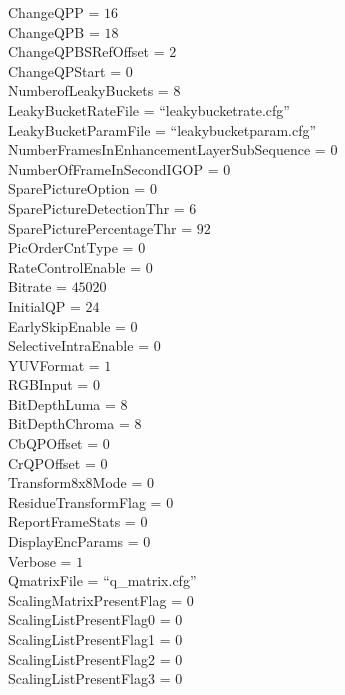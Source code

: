 ChangeQPP                = $16$ \\
ChangeQPB                = $18$ \\
ChangeQPBSRefOffset      =  $2$ \\
ChangeQPStart            =  $0$ \\
NumberofLeakyBuckets     =  $8$ \\
LeakyBucketRateFile      =  ``leakybucketrate.cfg'' \\
LeakyBucketParamFile     =  ``leakybucketparam.cfg'' \\
NumberFramesInEnhancementLayerSubSequence  = $0$ \\
NumberOfFrameInSecondIGOP                  = $0$ \\
SparePictureOption        =  $0$ \\
SparePictureDetectionThr  =  $6$ \\
SparePicturePercentageThr = $92$ \\
PicOrderCntType           = $0$ \\
RateControlEnable    =      $0$ \\
Bitrate              =  $45020$ \\
InitialQP            =     $24$ \\
EarlySkipEnable      =      $0$ \\
SelectiveIntraEnable =      $0$ \\
YUVFormat             = $1$ \\
RGBInput              = $0$ \\
BitDepthLuma          = $8$ \\
BitDepthChroma        = $8$ \\
CbQPOffset            = $0$ \\
CrQPOffset            = $0$ \\
Transform8x8Mode      = $0$ \\
ResidueTransformFlag  = $0$ \\
ReportFrameStats      = $0$ \\
DisplayEncParams      = $0$ \\
Verbose               = $1$ \\
QmatrixFile              = ``q\_matrix.cfg'' \\
ScalingMatrixPresentFlag = $0$ \\
ScalingListPresentFlag0  = $0$ \\
ScalingListPresentFlag1  = $0$ \\
ScalingListPresentFlag2  = $0$ \\
ScalingListPresentFlag3  = $0$ \\
